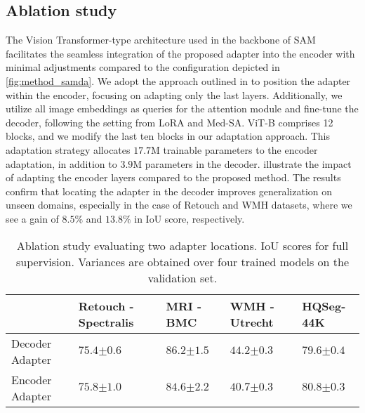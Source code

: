 \subsection{Ablation study}\label{sec:ablation_samda}
The Vision Transformer-type architecture used in the backbone of SAM facilitates the seamless integration of the proposed adapter into the encoder with minimal adjustments compared to the configuration depicted in \cref{fig:method_samda}. We adopt the approach outlined in  to position the adapter within the encoder, focusing on adapting only the last layers. Additionally, we utilize all image embeddings as queries for the attention module and fine-tune the decoder, following the setting from LoRA and Med-SA. ViT-B comprises 12 blocks, and we modify the last ten blocks in our adaptation approach. This adaptation strategy allocates $17.7$M trainable parameters to the encoder adaptation, in addition to $3.9$M parameters in the decoder.  illustrate the impact of adapting the encoder layers compared to the proposed method. The results confirm that locating the adapter in the decoder improves generalization on unseen domains, especially in the case of Retouch and WMH datasets, where we see a gain of $8.5\%$ and $13.8\%$ in IoU score, respectively.

\begin{table*}[]
\caption{Ablation study evaluating two adapter locations. IoU scores for full supervision. Variances are obtained over four trained models on the validation set.}
\label{tab:encoder_ablation_trained}
\centering
\begin{tabular}{@{}lP{3.3cm}P{2.5cm}P{2.5cm}P{2.5cm}@{}}
\toprule
 & Retouch - Spectralis & MRI - BMC & WMH - Utrecht & HQSeg-44K  \\ \midrule
Decoder Adapter & $75.4{\scriptscriptstyle \pm 0.6}$ & $\mathbf{86.2}{\scriptscriptstyle \pm 1.5}$ & $\mathbf{44.2}{\scriptscriptstyle \pm 0.3}$ & $79.6{\scriptscriptstyle \pm 0.4}$ \\
Encoder Adapter & $\mathbf{75.8}{\scriptscriptstyle \pm 1.0}$ & $84.6{\scriptscriptstyle \pm 2.2}$ & $40.7{\scriptscriptstyle \pm 0.3}$ & $\mathbf{80.8}{\scriptscriptstyle \pm 0.3}$ \\ \bottomrule 
\end{tabular}
\end{table*}

